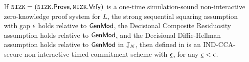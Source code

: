 %
%



\begin{theorem}
If $\mathtt{NIZK} = (\mathtt{NIZK}.\mathsf{Prove}, \mathtt{NIZK}.\mathsf{Vrfy})$ is a one-time simulation-sound non-interactive zero-knowledge proof system for $L$, the strong sequential squaring assumption with gap $\epsilon$ holds relative to $\mathsf{GenMod}$, the Decisional Composite Residuosity assumption holds relative to $\mathsf{GenMod}$, and the Decisional Diffie-Hellman assumption holds relative to $\mathsf{GenMod}$ in $\mathbb{J}_N$, then \mathlist{(\pgen, \com, \cvrfy, \dvrfy, \fdecom)} defined in  is an IND-CCA-secure non-interactive timed commitment scheme with $\underline{\epsilon}$, for any $\underline{\epsilon} < \epsilon$. 
\end{theorem}

